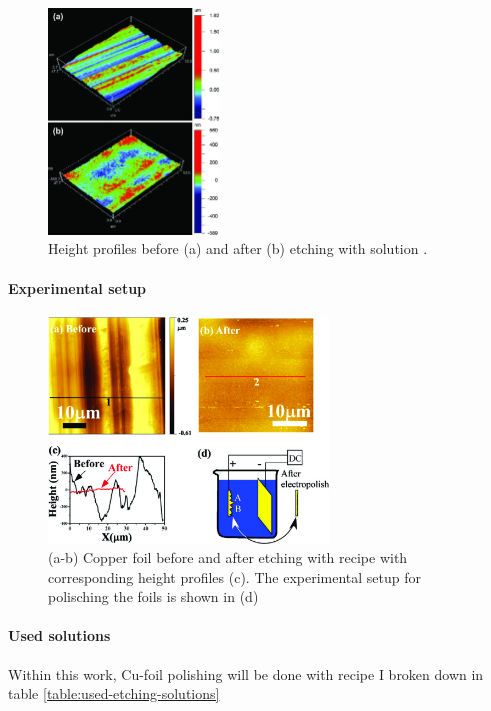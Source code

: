 

\begin{figure}[h]
	\begin{center}
		\includegraphics[height=6cm]{./images/0fcfd512d196815269000000-fig1.jpg}
	\end{center}
	\caption{Height profiles before (a) and after (b) etching with solution \cite{bin_zhang_low-temperature_2012}.}
\end{figure}

\paragraph{Experimental setup}

\begin{figure}[h]
	\begin{center}
		\includegraphics[height=6cm]{./images/cm1028854-fig2.jpg}
	\end{center}
	\caption{(a-b) Copper foil before and after etching with recipe \cite{luo_effect_2011} with corresponding height profiles (c). The experimental setup for polisching the foils is shown in (d)}
	\label{figure:luo-effect_2011}
\end{figure}
\paragraph{Used solutions}
Within this work, Cu-foil polishing will be done with recipe I broken down in table \ref{table:used-etching-solutions}

